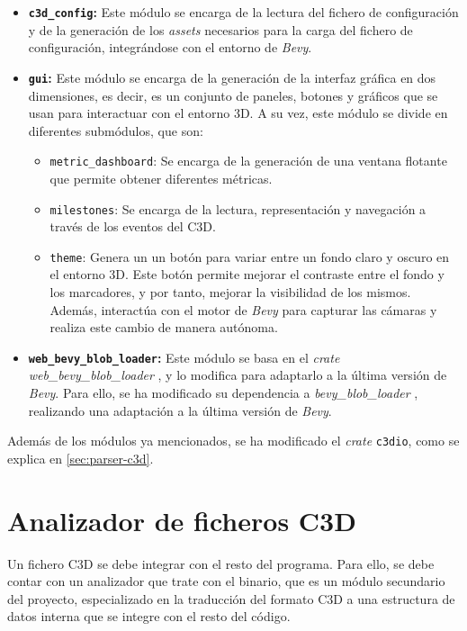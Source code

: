 \begin{itemize}
    \item \textbf{\texttt{c3d\_config}:} Este módulo se encarga de la lectura del fichero de configuración y de la generación de los \textit{assets} necesarios para la carga del fichero de configuración, integrándose con el entorno de \textit{Bevy}.
    \item \textbf{\texttt{gui}:} Este módulo se encarga de la generación de la interfaz gráfica en dos dimensiones, es decir, es un conjunto de paneles, botones y gráficos que se usan para interactuar con el entorno 3D. A su vez, este módulo se divide en diferentes submódulos, que son:
    \begin{itemize}
        \item \texttt{metric\_dashboard}: Se encarga de la generación de una ventana flotante que permite obtener diferentes métricas.
        \item \texttt{milestones}: Se encarga de la lectura, representación y navegación a través de los eventos del \ac{C3D}.
        \item \texttt{theme}: Genera un un botón para variar entre un fondo claro y oscuro en el entorno 3D. Este botón permite mejorar el contraste entre el fondo y los marcadores, y por tanto, mejorar la visibilidad de los mismos. Además, interactúa con el motor de \textit{Bevy} para capturar las cámaras y realiza este cambio de manera autónoma.
    \end{itemize}
    \item \textbf{\texttt{web\_bevy\_blob\_loader}:} Este módulo se basa en el \textit{crate} \textit{web\_bevy\_blob\_loader} \autocite{kayhKayhhhBevy_web_file_drop2024}, y lo modifica para adaptarlo a la última versión de \textit{Bevy}. Para ello, se ha modificado su dependencia a \textit{bevy\_blob\_loader} \autocite{kayhKayhhhBevy_blob_loader2024}, realizando una adaptación a la última versión de \textit{Bevy}.
\end{itemize}

Además de los módulos ya mencionados, se ha modificado el \textit{crate} \texttt{c3dio}, como se explica en \autoref{sec:parser-c3d}.

\section{Analizador de ficheros \acs{C3D}} \label{sec:parser-c3d}
Un fichero \ac{C3D} se debe integrar con el resto del programa. Para ello, se debe contar con un analizador que trate con el binario, que es un módulo secundario del proyecto, especializado en la traducción del formato \ac{C3D} a una estructura de datos interna que se integre con el resto del código.

